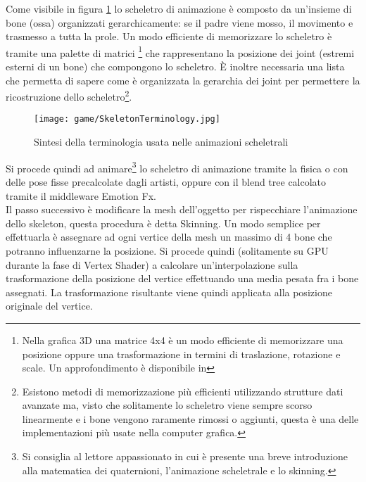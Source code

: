 	Come visibile in figura \ref{fig:SkeletonTerminology} lo scheletro di animazione è composto da un'insieme di bone (ossa) organizzati gerarchicamente: se il padre viene mosso, il movimento e trasmesso a tutta la prole. Un modo efficiente di memorizzare lo scheletro è tramite una palette di matrici \footnote{Nella grafica 3D una matrice 4x4 è un modo efficiente di memorizzare una posizione oppure una trasformazione in termini di traslazione, rotazione e scale. Un approfondimento è disponibile in } che rappresentano la posizione dei joint (estremi esterni di un bone) che compongono lo scheletro. È inoltre necessaria una lista che permetta di sapere come è organizzata la gerarchia dei joint per permettere la ricostruzione dello scheletro\footnote{Esistono metodi di memorizzazione più efficienti utilizzando strutture dati avanzate ma, visto che solitamente lo scheletro viene sempre scorso linearmente e i bone vengono raramente rimossi o aggiunti, questa è una delle implementazioni più usate nella computer grafica.}.\\
	
	\begin{figure}[h!] 
		\centering
		\texttt{[image: game/SkeletonTerminology.jpg]}
		\caption[Sintesi della terminologia usata nelle animazioni scheletrali]{Sintesi della terminologia usata nelle animazioni scheletrali\footnotemark{} }
		\label{fig:SkeletonTerminology}
	\end{figure}
	
	Si procede quindi ad animare\footnote{Si consiglia al lettore appassionato  in cui è presente una breve introduzione alla matematica dei quaternioni, l'animazione scheletrale e lo skinning.} lo scheletro di animazione tramite la fisica o con delle pose fisse precalcolate dagli artisti, oppure con il blend tree calcolato tramite il middleware Emotion Fx.\\
	
	Il passo successivo è modificare la mesh dell'oggetto per rispecchiare l'animazione dello skeleton, questa procedura è detta Skinning. Un modo semplice per effettuarla è assegnare ad ogni vertice della mesh un massimo di 4 bone che potranno influenzarne la posizione. Si procede quindi (solitamente su GPU durante la fase di Vertex Shader) a calcolare un'interpolazione sulla trasformazione della posizione del vertice effettuando una media pesata fra i bone assegnati. La trasformazione risultante viene quindi applicata alla posizione originale del vertice.\\
	
